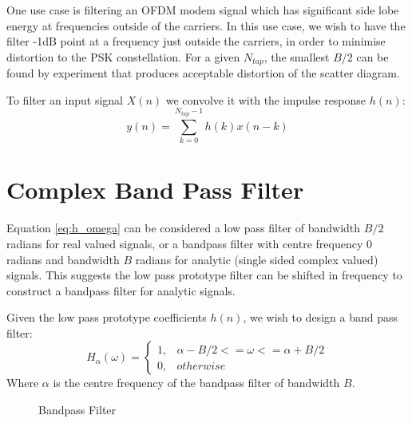 \documentclass{article}
\begin{document}
One use case is filtering an OFDM modem signal which has significant side lobe energy at frequencies outside of the carriers. In this use case, we wish to have the filter -1dB point at a frequency just outside the carriers, in order to minimise distortion to the PSK constellation.  For a given $N_{tap}$, the smallest $B/2$ can be found by experiment that produces acceptable distortion of the scatter diagram.

To filter an input signal $X(n)$ we convolve it with the impulse response $h(n)$:
\begin{equation} \label{eq:filter_conv}
y(n) = \sum_{k=0}^{N_{tap}-1} h(k) x(n-k)
\end{equation}

\section{Complex Band Pass Filter}

Equation \ref{eq:h_omega} can be considered a low pass filter of bandwidth $B/2$ radians for real valued signals, or a bandpass filter with centre frequency 0 radians and bandwidth $B$ radians for analytic (single sided complex valued) signals. This suggests the low pass prototype filter can be shifted in frequency to construct a bandpass filter for analytic signals. 

Given the low pass prototype coefficients $h(n)$, we wish to design a band pass filter:
\begin{equation} \label{eq:h_omega_bp}
  H_{\alpha}(\omega)= 
	\begin{cases}
      1, & \alpha - B/2 <= \omega <= \alpha + B/2 \\
      0, & otherwise
	\end{cases}
\end{equation}
Where $\alpha$ is the centre frequency of the bandpass filter of bandwidth $B$.  

\begin{figure}[h]
\caption{Bandpass Filter}
\vspace{5mm}
\label{fig:bandpass_freq}
\centering
{}
\end{figure}
\end{document}

